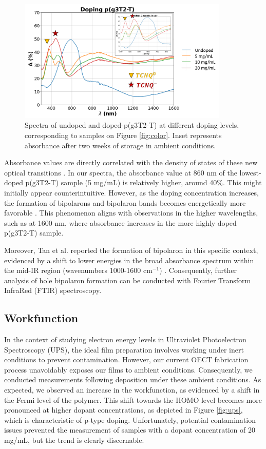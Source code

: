 \begin{figure}[ht]
  \centering
  \includegraphics[width=10cm]{Images/pdf/abs+inlet.pdf}
  \caption[Absorbance spectra of different doping levels of p(g3T2-T)]{Spectra of undoped and doped-p(g3T2-T) at different doping levels, corresponding to samples on Figure \ref{fig:color}. Inset represents absorbance after two weeks of storage in ambient conditions.}
  \label{fig:abs}
\end{figure}

Absorbance values are directly correlated with the density of states of these new optical transitions \cite{bredasPolaronsBipolaronsSolitons1985}. In our spectra, the absorbance value at 860 nm of the lowest-doped p(g3T2-T) sample (5 mg/mL) is relatively higher, around 40\%. This might initially appear counterintuitive. However, as the doping concentration increases, the formation of bipolarons and bipolaron bands becomes energetically more favorable \cite{enenglDopinginducedAbsorptionBands2016} . This phenomenon aligns with observations in the higher wavelengths, such as at 1600 nm, where absorbance increases in the more highly doped p(g3T2-T) sample.

Moreover, Tan et al. reported the formation of bipolaron in this specific context, evidenced by a shift to lower energies in the broad absorbance spectrum within the mid-IR region (wavenumbers 1000-1600 cm$^{-1}$) \cite{tanTuningOrganicElectrochemical2022}. Consequently, further analysis of hole bipolaron formation can be conducted with Fourier Transform InfraRed (FTIR) spectroscopy.
 
\subsection{Workfunction}

In the context of studying electron energy levels in Ultraviolet Photoelectron Spectroscopy (UPS), the ideal film preparation involves working under inert conditions to prevent contamination. However, our current OECT fabrication process unavoidably exposes our films to ambient conditions. Consequently, we conducted measurements following deposition under these ambient conditions. As expected, we observed an increase in the workfunction, as evidenced by a shift in the Fermi level of the polymer. This shift towards the HOMO level becomes more pronounced at higher dopant concentrations, as depicted in Figure \ref{fig:ups}, which is characteristic of p-type doping. Unfortunately, potential contamination issues prevented the measurement of samples with a dopant concentration of 20 mg/mL, but the trend is clearly discernable.

